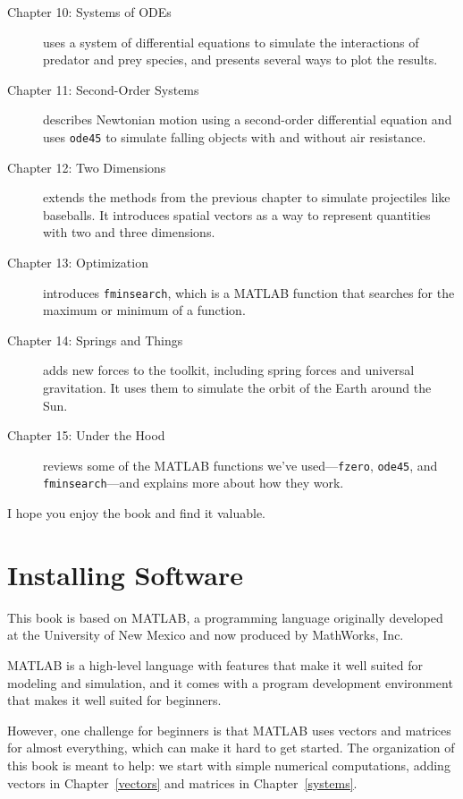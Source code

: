 \begin{description}
\item [Chapter 10: Systems of ODEs] uses a system of differential equations to simulate the interactions of predator and prey species, and presents several ways to plot the results.

\item [Chapter 11: Second-Order Systems] describes Newtonian motion using a second-order differential equation and uses \lstinline{ode45} to simulate falling objects with and without air resistance.

\item [Chapter 12: Two Dimensions] extends the methods from the previous chapter to simulate projectiles like baseballs.  It introduces spatial vectors as a way to represent quantities with two and three dimensions.

\item [Chapter 13: Optimization] introduces \lstinline{fminsearch}, which is a MATLAB function that searches for the maximum or minimum of a function.

\item [Chapter 14: Springs and Things] adds new forces to the toolkit, including spring forces and universal gravitation.  It uses them to simulate the orbit of the Earth around the Sun.

\item [Chapter 15: Under the Hood] reviews some of the MATLAB functions we've used---\lstinline{fzero}, \lstinline{ode45}, and \lstinline{fminsearch}---and explains more about how they work.

\end{description}

I hope you enjoy the book and find it valuable.


\section*{Installing Software}

This book is based on MATLAB, a programming language originally developed at the University of New Mexico and now produced by MathWorks, Inc.

MATLAB is a high-level language with features that make it well suited for modeling and simulation, and it comes with a program development environment that makes it well suited for beginners.

However, one challenge for beginners is that MATLAB uses vectors and matrices for almost everything, which can make it hard to get started.  The organization of this book is meant to help: we start with simple numerical computations, adding vectors in Chapter~\ref{vectors} and matrices in Chapter~\ref{systems}.

